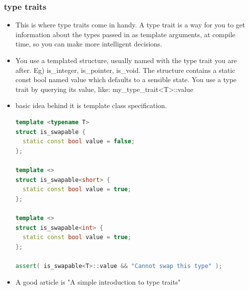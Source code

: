 \documentclass[a4paper,12pt,twoside]{book}
\begin{document}
\subsubsection{type traits}
\begin{itemize}
\item This is where type traits come in handy. A type trait is a way for you to get information about the types passed in as template arguments, at compile time, so you can make more intelligent decisions. 

\item You use a templated structure, usually named with the type trait you are after. Eg) is\_integer, is\_pointer, is\_void. The structure contains a static const bool named value which defaults to a sensible state. You use a type trait by querying its value, like: my\_type\_trait<T>::value
\item basic idea behind it is template class specification. 
\begin{lstlisting}[frame=single, language=c++]
template <typename T>
struct is_swapable {
  static const bool value = false;
};
 
template <>
struct is_swapable<short> {
  static const bool value = true;
};
 
template <>
struct is_swapable<int> {
  static const bool value = true;
};

assert( is_swapable<T>::value && "Cannot swap this type" );
\end{lstlisting}

\item A good article is "A simple introduction to type traits"
\end{itemize}
\end{document}
